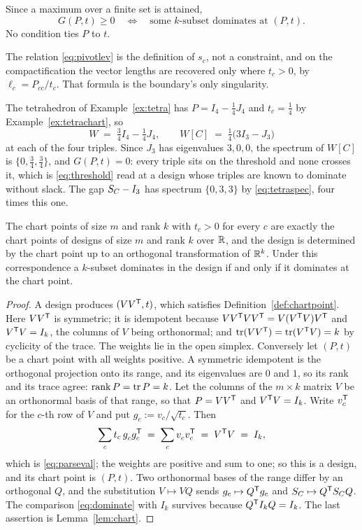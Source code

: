 Since a maximum over a finite set is attained,
\begin{equation}\label{eq:threshold}
  G(P,t)\ge0
  \quad\Longleftrightarrow\quad
  \text{some $k$-subset dominates at $(P,t)$.}
\end{equation}
No condition ties $P$ to $t$.

The relation \eqref{eq:pivotlev} is the definition of $s_c$, not a
constraint, and on the compactification the vector lengths are recovered
only where $t_c>0$, by $\ell_c=P_{cc}/t_c$.  That formula is the
boundary's only singularity.

\begin{example}
The tetrahedron of Example~\ref{ex:tetra} has $P=I_4-\tfrac14J_4$ and
$t_c=\tfrac14$ by Example~\ref{ex:tetrachart}, so
\[
  W\;=\;\tfrac34I_4-\tfrac14J_4,
  \qquad
  W[C]\;=\;\tfrac14\bigl(3I_3-J_3\bigr)
\]
at each of the four triples.  Since $J_3$ has eigenvalues $3,0,0$, the
spectrum of $W[C]$ is $\{0,\tfrac34,\tfrac34\}$, and $G(P,t)=0$: every
triple sits on the threshold and none crosses it, which is
\eqref{eq:threshold} read at a design whose triples are known to dominate
without slack.  The gap $S_{C}-I_3$ has spectrum $\{0,3,3\}$ by
\eqref{eq:tetraspec}, four times this one.
\end{example}

\begin{proposition}\label{prop:chartdesign}
The chart points of size $m$ and rank $k$ with $t_c>0$ for every $c$ are
exactly the chart points of designs of size $m$ and rank $k$ over $\mathbb{R}$,
and the design is determined by the chart point up to an orthogonal
transformation of $\mathbb{R}^k$.  Under this correspondence a $k$-subset dominates in the design
if and only if it dominates at the chart point.
\end{proposition}

\begin{proof}
A design produces $(VV^{\mathsf{T}},t)$, which satisfies
Definition~\ref{def:chartpoint}.  Here $VV^{\mathsf{T}}$ is symmetric; it is
idempotent because $VV^{\mathsf{T}} VV^{\mathsf{T}}=V(V^{\mathsf{T}} V)V^{\mathsf{T}}$ and $V^{\mathsf{T}} V=I_k$, the
columns of $V$ being orthonormal; and $\operatorname{tr}(VV^{\mathsf{T}})=\operatorname{tr}(V^{\mathsf{T}} V)=k$ by
cyclicity of the trace.  The weights lie in the open simplex.
Conversely let $(P,t)$ be a chart point with all weights positive.  A
symmetric idempotent is the orthogonal projection onto its range, and
its eigenvalues are $0$ and $1$, so its rank and its trace agree:
$\operatorname{rank} P=\operatorname{tr} P=k$.  Let the columns of the $m\times k$ matrix $V$ be an
orthonormal basis of that range, so that $P=VV^{\mathsf{T}}$ and $V^{\mathsf{T}} V=I_k$.
Write $v_c^{\mathsf{T}}$ for the $c$-th row of $V$ and put $g_c:=v_c/\sqrt{t_c}$.
Then
\[
  \sum_c t_c\,g_c^{\vphantom{\mathsf{T}}}g_c\tp
  \;=\;\sum_c v_c^{\vphantom{\mathsf{T}}}v_c\tp\;=\;V\tp V\;=\;I_k ,
\]
which is \eqref{eq:parseval}; the weights are positive and sum to one; so
this is a design, and its chart point is $(P,t)$.  Two orthonormal bases
of the range differ by an orthogonal $Q$, and the substitution
$V\mapsto VQ$ sends $g_c\mapsto Q^{\mathsf{T}} g_c$ and $S_{C}\mapsto Q^{\mathsf{T}}S_{C} Q$.
The comparison \eqref{eq:dominate} with $I_k$ survives because
$Q^{\mathsf{T}} I_kQ=I_k$.  The last assertion is Lemma~\ref{lem:chart}.
\end{proof}

